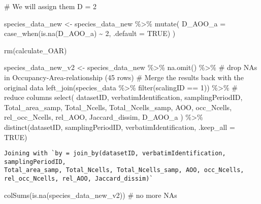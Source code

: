 \documentclass[
  letterpaper,
  DIV=11,
  numbers=noendperiod]{scrreprt}
\newenvironment{Shaded}{\begin{snugshade}}{\end{snugshade}}
\newcommand{\AttributeTok}[1]{\textcolor[rgb]{0.40,0.45,0.13}{#1}}
\newcommand{\CommentTok}[1]{\textcolor[rgb]{0.37,0.37,0.37}{#1}}
\newcommand{\ConstantTok}[1]{\textcolor[rgb]{0.56,0.35,0.01}{#1}}
\newcommand{\DecValTok}[1]{\textcolor[rgb]{0.68,0.00,0.00}{#1}}
\newcommand{\FunctionTok}[1]{\textcolor[rgb]{0.28,0.35,0.67}{#1}}
\newcommand{\NormalTok}[1]{\textcolor[rgb]{0.00,0.23,0.31}{#1}}
\newcommand{\OtherTok}[1]{\textcolor[rgb]{0.00,0.23,0.31}{#1}}
\newcommand{\SpecialCharTok}[1]{\textcolor[rgb]{0.37,0.37,0.37}{#1}}
\begin{document}
\begin{Shaded}
\begin{Highlighting}[]
\CommentTok{\# We will assign them D = 2}

\NormalTok{species\_data\_new }\OtherTok{\textless{}{-}}\NormalTok{ species\_data\_new }\SpecialCharTok{\%\textgreater{}\%}
  \FunctionTok{mutate}\NormalTok{(}
    \AttributeTok{D\_AOO\_a =} \FunctionTok{case\_when}\NormalTok{(}\FunctionTok{is.na}\NormalTok{(D\_AOO\_a) }\SpecialCharTok{\textasciitilde{}} \DecValTok{2}\NormalTok{,}
                        \AttributeTok{.default =} \ConstantTok{TRUE}\NormalTok{)}
\NormalTok{  )}


\FunctionTok{rm}\NormalTok{(calculate\_OAR)}


\NormalTok{species\_data\_new\_v2 }\OtherTok{\textless{}{-}}\NormalTok{ species\_data\_new }\SpecialCharTok{\%\textgreater{}\%}
  \FunctionTok{na.omit}\NormalTok{() }\SpecialCharTok{\%\textgreater{}\%} \CommentTok{\# drop NAs in Occupancy{-}Area{-}relationship (45 rows)}
  \CommentTok{\# Merge the results back with the original data}
  \FunctionTok{left\_join}\NormalTok{(species\_data }\SpecialCharTok{\%\textgreater{}\%} \FunctionTok{filter}\NormalTok{(scalingID }\SpecialCharTok{==} \DecValTok{1}\NormalTok{)) }\SpecialCharTok{\%\textgreater{}\%}
  \CommentTok{\# reduce columns}
  \FunctionTok{select}\NormalTok{(}
\NormalTok{    datasetID, verbatimIdentification, samplingPeriodID,}
\NormalTok{    Total\_area\_samp, Total\_Ncells, Total\_Ncells\_samp,}
\NormalTok{    AOO, occ\_Ncells, rel\_occ\_Ncells, rel\_AOO,}
\NormalTok{    Jaccard\_dissim, D\_AOO\_a}
\NormalTok{  ) }\SpecialCharTok{\%\textgreater{}\%}
  \FunctionTok{distinct}\NormalTok{(datasetID, samplingPeriodID, verbatimIdentification, }\AttributeTok{.keep\_all =} \ConstantTok{TRUE}\NormalTok{)}
\end{Highlighting}
\end{Shaded}

\begin{verbatim}
Joining with `by = join_by(datasetID, verbatimIdentification, samplingPeriodID,
Total_area_samp, Total_Ncells, Total_Ncells_samp, AOO, occ_Ncells,
rel_occ_Ncells, rel_AOO, Jaccard_dissim)`
\end{verbatim}

\begin{Shaded}
\begin{Highlighting}[]
\FunctionTok{colSums}\NormalTok{(}\FunctionTok{is.na}\NormalTok{(species\_data\_new\_v2)) }\CommentTok{\# no more NAs}
\end{Highlighting}
\end{Shaded}
\end{document}
